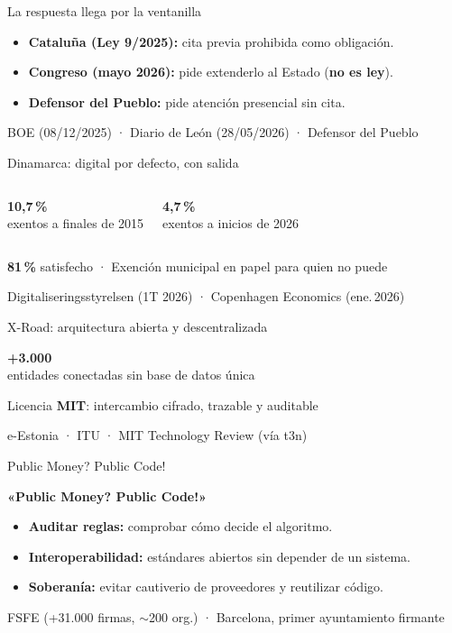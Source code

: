 \documentclass[aspectratio=169,12pt]{beamer}
\def\navprev{}
\def\navnext{}
\newcommand{\nav}[2]{\gdef\navprev{#1}\gdef\navnext{#2}}
\newcommand{\cifra}[2]{%
  \begin{center}
    {\color{terra}\fontsize{36}{40}\selectfont\bfseries #1}\\[0.2cm]
    {\large #2}
  \end{center}}
\newcommand{\fuente}[1]{\vfill{\small\color{gris}#1\par}}
\begin{document}
\nav{Brecha por edad}{Dinamarca}
\begin{frame}{La respuesta llega por la ventanilla}
  \begin{itemize}
    \item \textbf{Cataluña (Ley 9/2025):} cita previa prohibida como obligación.
    \item \textbf{Congreso (mayo 2026):} pide extenderlo al Estado (\alert{\textbf{no es ley}}).
    \item \textbf{Defensor del Pueblo:} pide atención presencial sin cita.
  \end{itemize}
  \fuente{BOE (08/12/2025) · Diario de León (28/05/2026) · Defensor del Pueblo}
\end{frame}

\nav{Ventanilla}{X-Road}
\begin{frame}{Dinamarca: digital por defecto, con salida}
  \begin{columns}[T]
      \cifra{10,7\,\%}{exentos a finales de 2015}
      \cifra{4,7\,\%}{exentos a inicios de 2026}
  \end{columns}
  \vspace{0.3cm}
  \begin{center}
    {\large \textbf{81\,\%} satisfecho · Exención municipal en papel para quien no puede}
  \end{center}
  \fuente{Digitaliseringsstyrelsen (1T 2026) · Copenhagen Economics (ene.\,2026)}
\end{frame}

\nav{Dinamarca}{Public Code}
\begin{frame}{X-Road: arquitectura abierta y descentralizada}
  \cifra{+3.000}{entidades conectadas sin base de datos única}
  \begin{center}
    {\large Licencia \textbf{MIT}: intercambio cifrado, trazable y auditable}
  \end{center}
  \fuente{e-Estonia · ITU · MIT Technology Review (vía t3n)}
\end{frame}

\nav{X-Road}{Cierre}
\begin{frame}{Public Money? Public Code!}
  \begin{center}
    {\color{terra}\LARGE\bfseries «Public Money? Public Code!»}
  \end{center}
  \vspace{0.2cm}
  \begin{itemize}
    \item \textbf{Auditar reglas:} comprobar cómo decide el algoritmo.
    \item \textbf{Interoperabilidad:} estándares abiertos sin depender de un sistema.
    \item \textbf{Soberanía:} evitar cautiverio de proveedores y reutilizar código.
  \end{itemize}
  \fuente{FSFE (+31.000 firmas, $\sim$200 org.) · Barcelona, primer ayuntamiento firmante}
\end{frame}
\end{document}
